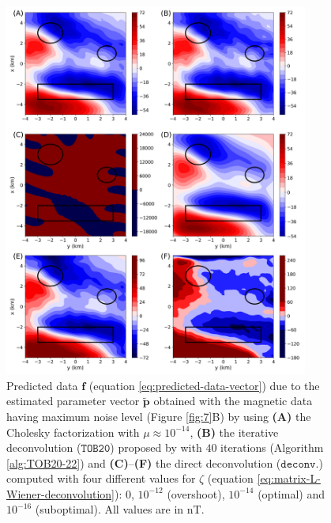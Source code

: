 \begin{figure}[htbp]
	\begin{center}
		\includegraphics[width=10cm]{Fig/stability_mag_comparison}
	\end{center}
	\caption{
		Predicted data $\mathbf{f}$ (equation \ref{eq:predicted-data-vector}) due to the estimated parameter vector
		$\tilde{\mathbf{p}}$ obtained with the magnetic data having maximum noise level (Figure \ref{fig:7}B) by using
		\textbf{(A)} the Cholesky factorization with $\mu \approx 10^{-14}$, 
		\textbf{(B)} the iterative deconvolution ($\mathtt{TOB20}$) proposed by \citet{takahashi-etal2022} with $40$ 
		iterations (Algorithm \ref{alg:TOB20-22}) and
		\textbf{(C)}--\textbf{(F)} the direct deconvolution ($\mathtt{deconv.}$) computed with four different 
		values for $\zeta$ (equation \ref{eq:matrix-L-Wiener-deconvolution}): $0$, $10^{-12}$ (overshoot), $10^{-14}$ (optimal)
		and $10^{-16}$ (suboptimal).
		All values are in $\mathrm{nT}$.
		}
	\label{fig:8}
\end{figure}

